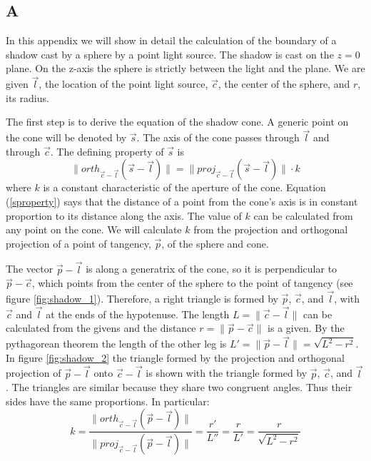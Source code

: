 \documentclass[10pt]{article}
\begin{document}
\begin{appendices}
\chapter{A} \label{a}

In this appendix we will show in detail the calculation of the boundary of a shadow cast by a sphere by a point light source. The shadow is cast on the $z=0$ plane. On the z-axis the sphere is strictly between the light and the plane. We are given $\vec{l}$, the location of the point light source, $\vec{c}$, the center of the sphere, and $r$, its radius.

The first step is to derive the equation of the shadow cone. A generic point on the cone will be denoted by $\vec{s}$. The axis of the cone passes through $\vec{l}$ and through $\vec{c}$. The defining property of $\vec{s}$ is 
\begin{equation}\label{sproperty}
\|orth_{\vec{c}-\vec{l}} (\vec{s} - \vec{l})\| = \|proj_{\vec{c}-\vec{l}} (\vec{s} - \vec{l})\| \cdot k
\end{equation}
where $k$ is a constant characteristic of the aperture of the cone. Equation (\ref{sproperty}) says that the distance of a point from the cone's axis is in constant proportion to its distance along the axis. The value of $k$ can be calculated from any point on the cone. We will calculate $k$ from the projection and orthogonal projection of a point of tangency, $\vec{p}$, of the sphere and cone.

The vector $\vec{p} - \vec{l}$ is along a generatrix of the cone, so it is perpendicular to $\vec{p} - \vec{c}$, which points from the center of the sphere to the point of tangency (see figure \ref{fig:shadow_1}). Therefore, a right triangle is formed by $\vec{p}$, $\vec{c}$, and $\vec{l}$, with $\vec{c}$ and $\vec{l}$ at the ends of the hypotenuse. The length $L=\|\vec{c}-\vec{l}\|$ can be calculated from the givens and the distance $r=\|\vec{p}-\vec{c}\|$ is a given. By the pythagorean theorem the length of the other leg is $L'=\|\vec{p}-\vec{l}\|=\sqrt{L^2-r^2}$. In figure \ref{fig:shadow_2} the triangle formed by the projection and orthogonal projection of $\vec{p}-\vec{l}$ onto $\vec{c}-\vec{l}$ is shown with the triangle formed by $\vec{p}$, $\vec{c}$, and $\vec{l}$. The triangles are similar because they share two congruent angles. Thus their sides have the same proportions. In particular:
\[
k = \frac{\|orth_{\vec{c}-\vec{l}} (\vec{p} - \vec{l})\|}{\|proj_{\vec{c}-\vec{l}} (\vec{p} - \vec{l})\|} = \frac{r'}{L''} = \frac{r}{L'} = \frac{r}{\sqrt{L^2-r^2}}
\]


\end{appendices}
\end{document}
